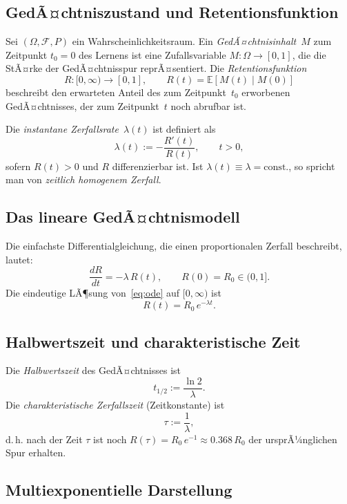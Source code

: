 ﻿\documentclass[12pt,a4paper,twoside]{article}
\theoremstyle{theormstyle}
\theoremstyle{proofstyle}
\begin{document}
	\subsection{GedÃ¤chtniszustand und Retentionsfunktion}
	
		Sei $(\Omega, \mathcal{F}, P)$ ein Wahrscheinlichkeitsraum.
		Ein \emph{GedÃ¤chtnisinhalt}~$M$ zum Zeitpunkt $t_0 = 0$ des Lernens ist
		eine Zufallsvariable $M : \Omega \to [0,1]$, die die StÃ¤rke der
		GedÃ¤chtnisspur reprÃ¤sentiert.
		Die \emph{Retentionsfunktion}
		\[
		R : [0,\infty) \to [0,1], \qquad R(t) = \mathbb{E}[M(t) \mid M(0)]
		\]
		beschreibt den erwarteten Anteil des zum Zeitpunkt~$t_0$ erworbenen
		GedÃ¤chtnisses, der zum Zeitpunkt~$t$ noch abrufbar ist.
	
		Die \emph{instantane Zerfallsrate}~$\lambda(t)$ ist definiert als
		\[
		\lambda(t) := -\frac{R'(t)}{R(t)}, \qquad t > 0,
		\]
		sofern $R(t) > 0$ und $R$ differenzierbar ist.
		Ist $\lambda(t) \equiv \lambda = \mathrm{const.}$, so spricht man von
		\emph{zeitlich homogenem Zerfall}.
	
	\subsection{Das lineare GedÃ¤chtnismodell}
	
	Die einfachste Differentialgleichung, die einen proportionalen Zerfall
	beschreibt, lautet:
	\begin{equation}
		\frac{dR}{dt} = -\lambda\,R(t), \qquad R(0) = R_0 \in (0,1].
		\label{eq:ode}
	\end{equation}
	Die eindeutige LÃ¶sung von~\eqref{eq:ode} auf $[0,\infty)$ ist
	\begin{equation}
		\boxed{R(t) = R_0\,e^{-\lambda t}.}
		\label{eq:loesung}
	\end{equation}
	
	\subsection{Halbwertszeit und charakteristische Zeit}
	
		Die \emph{Halbwertszeit} des GedÃ¤chtnisses ist
		\[
		t_{1/2} := \frac{\ln 2}{\lambda}.
		\]
		Die \emph{charakteristische Zerfallszeit} (Zeitkonstante) ist
		\[
		\tau := \frac{1}{\lambda},
		\]
		d.\,h. nach der Zeit $\tau$ ist noch $R(\tau) = R_0\,e^{-1} \approx 0.368\,R_0$
		der ursprÃ¼nglichen Spur erhalten.
	
	\subsection{Multiexponentielle Darstellung}
	
\end{document}
